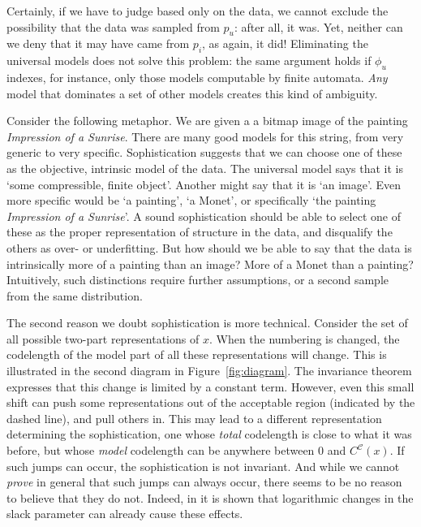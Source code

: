 \documentclass{style/llncs}
\newcommand{\C}{\mathscr C}
\begin{document}
Certainly, if we have to judge based only on the data, we cannot exclude the possibility that the data was sampled from $p_u$: after all, it was. Yet, neither can we deny that it may have came from $p_i$, as again, it did!  Eliminating the universal models does not solve this problem: the same argument holds if $\phi_u$ indexes, for instance, only those models computable by finite automata. \emph{Any} model that dominates a set of other models creates this kind of ambiguity.

Consider the following metaphor. We are given a a bitmap image of the painting \emph{Impression of a Sunrise}. There are many good models for this string, from very generic to very specific. Sophistication suggests that we can choose one of these as the objective, intrinsic model of the data. The universal model says that it is `some compressible, finite object'. Another might say that it is `an image'. Even more specific would be `a painting', `a Monet', or specifically `the painting \emph{Impression of a Sunrise}'. A sound sophistication should be able to select one of these as the proper representation of structure in the data, and disqualify the others as over- or underfitting. But how should we be able to say that the data is intrinsically more of a painting than an image? More of a Monet than a painting? Intuitively, such distinctions require further assumptions, or a second sample from the same distribution.

The second reason we doubt sophistication is more technical. Consider the set of all possible two-part representations of $x$. When the numbering is changed, the codelength of the model part of all these representations will change. This is illustrated in the second diagram in Figure~\ref{fig:diagram}. The invariance theorem expresses that this change is limited by a constant term. However, even this small shift can push some representations out of the acceptable region (indicated by the dashed line), and pull others in. This may lead to a different representation determining the sophistication, one whose \emph{total} codelength is close to what it was before, but whose \emph{model} codelength can be anywhere between $0$ and $C^\C(x)$. If such jumps can occur, the sophistication is not invariant. And while we cannot \emph{prove} in general that such jumps can always occur, there seems to be no reason to believe that they do not. Indeed, in \cite{antunes2013sophistication} it is shown that logarithmic changes in the slack parameter can already cause these effects.
\end{document}
